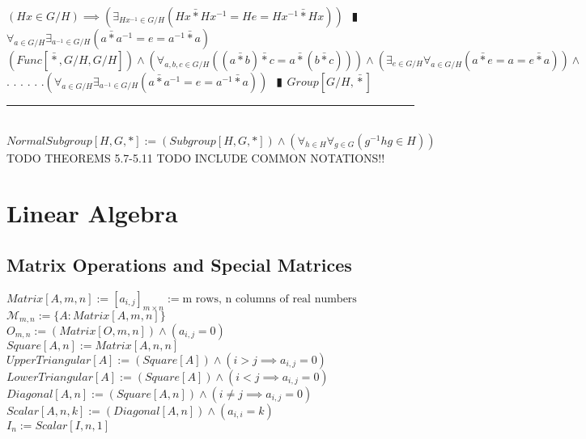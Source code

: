 \documentclass{book}
\newcommand{\abr}{:=}
\newcommand{\cont}{\phantom{.}. . .\phantom{.}}
\newcommand{\pipe}{$\phantom{(}\vrectangleblack\phantom{)}$}
\newcommand{\pr}[1]{\left(#1\right)}
\begin{document}
\begin{enumerate}
  \lit $(H x \in G / H) \implies \pr{\exists_{H x^{-1} \in G / H}(H x \bar{*} H x^{-1} = H e = H x^{-1} \bar{*} H x)}$ \pipe $\forall_{a \in G / H} \exists_{a^{-1} \in G / H}(a \bar{*} a^{-1} = e = a^{-1} \bar{*} a)$
  \lit $(Func[\bar{*}, G / H, G / H]) \land \pr{\forall_{a, b, c \in G / H}\pr{(a \bar{*} b) \bar{*} c = a \bar{*} (b \bar{*} c)}} \land \pr{\exists_{e \in G / H} \forall_{a \in G / H}(a \bar{*} e = a = e \bar{*} a)} \land$ \cont
  \lit \cont $\pr{\forall_{a \in G / H} \exists_{a^{-1} \in G / H}(a \bar{*} a^{-1} = e = a^{-1} \bar{*} a)}$ \pipe $Group[G / H, \bar{*}]$
\end{enumerate} \vspace{.75mm} \hrule \vspace{.75mm} \ \\ 

$NormalSubgroup[H, G, *] \abr (Subgroup[H, G, *]) \land \pr{\forall_{h \in H} \forall_{g \in G}(g^{-1} h g \in H)}$ \\

TODO THEOREMS 5.7-5.11
TODO INCLUDE COMMON NOTATIONS!!

%
%
%
\chapter{Linear Algebra} %

\section{Matrix Operations and Special Matrices}
$Matrix[A, m, n] \abr [a_{i, j}]_{m \times n} \abr \text{m rows, n columns of real numbers}$ \\
$\mathcal{M}_{m, n} \abr \{A : Matrix[A, m, n]\}$ \\
$O_{m, n} \abr (Matrix[O, m, n]) \land (a_{i, j} = 0)$ \\
$Square[A, n] \abr Matrix[A, n, n]$ \\
$UpperTriangular[A] \abr (Square[A]) \land (i > j \implies a_{i, j} = 0)$ \\
$LowerTriangular[A] \abr (Square[A]) \land (i < j \implies a_{i, j} = 0)$ \\
$Diagonal[A, n] \abr (Square[A, n]) \land (i \neq j \implies a_{i, j} = 0)$ \\
$Scalar[A, n, k] \abr (Diagonal[A, n]) \land (a_{i, i} = k)$ \\
$I_n \abr Scalar[I, n, 1]$ \\
\end{document}
